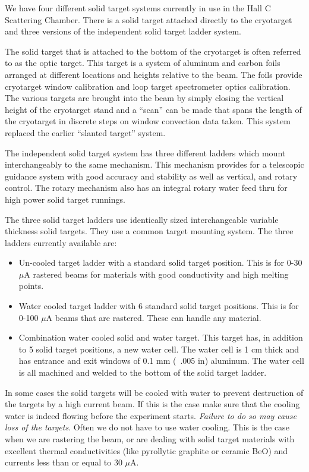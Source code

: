 We have four different solid target systems currently in use in the
Hall C Scattering Chamber.  There is a solid target attached directly
to the cryotarget and three versions of the independent solid target
ladder system.

The solid target that is attached to the bottom of the cryotarget is
often referred to as the optic target.  This target is a system of
aluminum and carbon foils arranged at different locations and heights
relative to the beam.  The foils provide cryotarget window
calibration and loop target spectrometer optics calibration.  The
various targets are brought into the beam by simply closing the
vertical height of the cryotarget stand and a ``scan'' can be made
that spans the length of the cryotarget in discrete steps on window
convection data taken.  This system replaced the earlier ``slanted
target'' system.

The independent solid target system has three different ladders which
mount interchangeably to the same mechanism.  This mechanism
provides for a telescopic guidance system with good accuracy
and stability as well as vertical, and rotary control.  The rotary mechanism also
has an integral rotary water feed thru for high power solid target
runnings. 

The three solid target ladders use identically sized interchangeable
variable thickness solid targets.  They use a common target mounting
system.  The three ladders currently available are:

\begin{itemize}
\item{Un-cooled target ladder with a standard solid target position.
This is for 0-30 $\mu$A rastered beams for materials with good
conductivity and high melting points.}
\item{Water cooled target ladder with 6 standard solid target
positions.  This is for 0-100 $\mu$A beams that are rastered.  These
can handle any material.}
\item{Combination water cooled solid and water target.  This target
has, in addition to 5 solid target positions, a new water cell.
The water cell is 1 cm thick and has entrance and exit windows of 0.1
mm (~.005 in) aluminum.  The water cell is all machined and welded to
the bottom of the solid target ladder.}
\end{itemize}

In some cases the solid targets will be cooled with water to prevent
destruction of the targets by a high current beam. If this is the case
make sure that the
cooling water is indeed flowing before the experiment starts.
{\sl Failure to do so may cause loss of the targets}. Often we
do not have to use water cooling. This is the case when we are
rastering the beam, or are dealing with solid target
materials with excellent thermal conductivities (like pyrollytic
graphite or ceramic BeO) and currents less than or equal to 30 $\mu$A.

